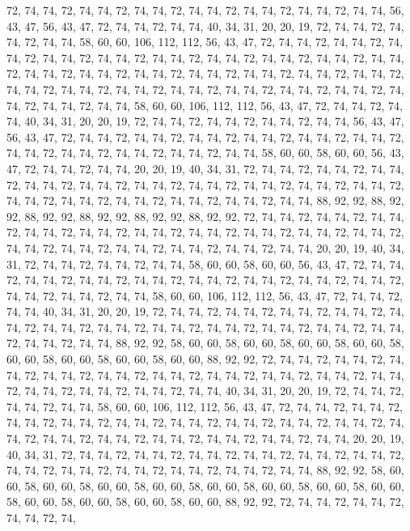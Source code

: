 72, 74, 74, 72, 74, 74, 72, 74, 74, 72, 74, 74, 72, 74, 74, 72, 74, 74, 72, 74, 74, 56, 43, 47, 56, 43, 47, 72, 74, 74, 72, 74, 74, 40, 34, 31, 20, 20, 19, 72, 74, 74, 72, 74, 74, 72, 74, 74, 58, 60, 60, 106, 112, 112, 56, 43, 47, 72, 74, 74, 72, 74, 74, 72,
74, 74, 72, 74, 74, 72, 74, 74, 72, 74, 74, 72, 74, 74, 72, 74, 74, 72, 74, 74, 72, 74, 74, 72, 74, 74, 72, 74, 74, 72, 74, 74, 72, 74, 74, 72, 74, 74, 72, 74, 74, 72, 74, 74, 72, 74, 74, 72, 74, 74, 72, 74, 74, 72, 74, 74, 72, 74, 74, 72, 74, 74, 72, 74,
74, 72, 74, 74, 72, 74, 74, 72, 74, 74, 58, 60, 60, 106, 112, 112, 56, 43, 47, 72, 74, 74, 72, 74, 74, 40, 34, 31, 20, 20, 19, 72, 74, 74, 72, 74, 74, 72, 74, 74, 72, 74, 74, 56, 43, 47, 56, 43, 47, 72, 74, 74, 72, 74, 74, 72, 74, 74, 72, 74, 74, 72, 74, 74,
72, 74, 74, 72, 74, 74, 72, 74, 74, 72, 74, 74, 72, 74, 74, 72, 74, 74, 58, 60, 60, 58, 60, 60, 56, 43, 47, 72, 74, 74, 72, 74, 74, 20, 20, 19, 40, 34, 31, 72, 74, 74, 72, 74, 74, 72, 74, 74, 72, 74, 74, 72, 74, 74, 72, 74, 74, 72, 74, 74, 72, 74, 74, 72,
74, 74, 72, 74, 74, 72, 74, 74, 72, 74, 74, 72, 74, 74, 72, 74, 74, 72, 74, 74, 72, 74, 74, 88, 92, 92, 88, 92, 92, 88, 92, 92, 88, 92, 92, 88, 92, 92, 88, 92, 92, 72, 74, 74, 72, 74, 74, 72, 74, 74, 72, 74, 74, 72, 74, 74, 72, 74, 74, 72, 74, 74, 72, 74,
74, 72, 74, 74, 72, 74, 74, 72, 74, 74, 72, 74, 74, 72, 74, 74, 72, 74, 74, 72, 74, 74, 72, 74, 74, 20, 20, 19, 40, 34, 31, 72, 74, 74, 72, 74, 74, 72, 74, 74, 58, 60, 60, 58, 60, 60, 56, 43, 47, 72, 74, 74, 72, 74, 74, 72, 74, 74, 72, 74, 74, 72, 74, 74,
72, 74, 74, 72, 74, 74, 72, 74, 74, 72, 74, 74, 72, 74, 74, 72, 74, 74, 58, 60, 60, 106, 112, 112, 56, 43, 47, 72, 74, 74, 72, 74, 74, 40, 34, 31, 20, 20, 19, 72, 74, 74, 72, 74, 74, 72, 74, 74, 72, 74, 74, 72, 74, 74, 72, 74, 74, 72, 74, 74, 72, 74, 74, 72,
74, 74, 72, 74, 74, 72, 74, 74, 72, 74, 74, 72, 74, 74, 72, 74, 74, 88, 92, 92, 58, 60, 60, 58, 60, 60, 58, 60, 60, 58, 60, 60, 58, 60, 60, 58, 60, 60, 58, 60, 60, 58, 60, 60, 88, 92, 92, 72, 74, 74, 72, 74, 74, 72, 74, 74, 72, 74, 74, 72, 74, 74, 72, 74,
74, 72, 74, 74, 72, 74, 74, 72, 74, 74, 72, 74, 74, 72, 74, 74, 72, 74, 74, 72, 74, 74, 72, 74, 74, 40, 34, 31, 20, 20, 19, 72, 74, 74, 72, 74, 74, 72, 74, 74, 58, 60, 60, 106, 112, 112, 56, 43, 47, 72, 74, 74, 72, 74, 74, 72, 74, 74, 72, 74, 74, 72, 74, 74,
72, 74, 74, 72, 74, 74, 72, 74, 74, 72, 74, 74, 72, 74, 74, 72, 74, 74, 72, 74, 74, 72, 74, 74, 72, 74, 74, 72, 74, 74, 72, 74, 74, 20, 20, 19, 40, 34, 31, 72, 74, 74, 72, 74, 74, 72, 74, 74, 72, 74, 74, 72, 74, 74, 72, 74, 74, 72, 74, 74, 72, 74, 74, 72,
74, 74, 72, 74, 74, 72, 74, 74, 72, 74, 74, 88, 92, 92, 58, 60, 60, 58, 60, 60, 58, 60, 60, 58, 60, 60, 58, 60, 60, 58, 60, 60, 58, 60, 60, 58, 60, 60, 58, 60, 60, 58, 60, 60, 58, 60, 60, 58, 60, 60, 88, 92, 92, 72, 74, 74, 72, 74, 74, 72, 74, 74, 72, 74,
